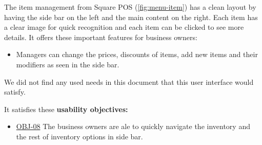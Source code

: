 \documentclass[]{VUMIFTemplateClass}
\begin{document}
The item management from Square POS (\ref{fig:menu-item}) has a clean layout by having the side bar on the left and the main content on the right. Each item has
a clear image for quick recognition and each item can be clicked to see more details. It
offers these important features for business owners: 

\begin{itemize}
    \item Managers can change the prices, discounts of items, add new items and their modifiers as seen in the side bar.
\end{itemize}

We did not find any used needs in this document that this user interface would satisfy.

It satisfies these \textbf{usability objectives:}

\begin{itemize}
    \item \hyperref[OBJ-08]{OBJ-08} The business owners are ale to quickly navigate the inventory and the rest of inventory options in side bar.
\end{itemize}









\end{document}
